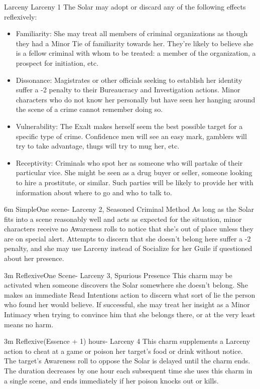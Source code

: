 \begin{Ability}{Larceny}
  {Larceny 1}
  The Solar may adopt or discard any of the following effects reflexively:
  \begin{itemize}
    \item Familiarity: She may treat all members of criminal organizations as though they had a Minor Tie of familiarity towards her. They're likely to believe she is a fellow criminal with whom to be treated: a member of the organization, a prospect for initiation, etc.
    \item Dissonance: Magistrates or other officials seeking to establish her identity suffer a -2 penalty to their Bureaucracy and Investigation actions. Minor characters who do not know her personally but have seen her hanging around the scene of a crime cannot remember doing so.
    \item Vulnerability: The Exalt makes herself seem the best possible target for a specific type of crime. Confidence men will see an easy mark, gamblers will try to take advantage, thugs will try to mug her, etc.
    \item Receptivity: Criminals who spot her as someone who will partake of their particular vice. She might be seen as a drug buyer or seller, someone looking to hire a prostitute, or similar. Such parties will be likely to provide her with information about where to go and who to talk to.
  \end{itemize}

  {6m}
  {Simple}{One scene}{-}
  {Larceny 2, Seasoned Criminal Method}
  As long as the Solar fits into a scene reasonably well and acts as expected for the situation, minor characters receive no Awareness rolls to notice that she's out of place unless they are on special alert. Attempts to discern that she doesn't belong here suffer a -2 penalty, and she may use Larceny instead of Socialize for her Guile if questioned about her presence.

  {3m}
  {Reflexive}{One Scene}{-}
  {Larceny 3, Spurious Presence}
  This charm may be activated when someone discovers the Solar somewhere she doesn't belong. She makes an immediate Read Intentions action to discern what sort of lie the person who found her would believe. If successful, she may treat her insight as a Minor Intimacy when trying to convince him that she belongs there, or at the very least means no harm.

  {3m}
  {Reflexive}{(Essence + 1) hours}{-}
  {Larceny 4}
  This charm supplements a Larceny action to cheat at a game or poison her target's food or drink without notice. The target's Awareness roll to oppose the Solar is delayed until the charm ends. The duration decreases by one hour each subsequent time she uses this charm in a single scene, and ends immediately if her poison knocks out or kills.


\end{Ability}
